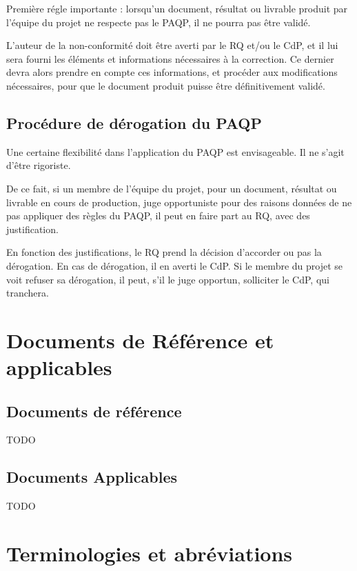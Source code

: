 Première régle importante : lorsqu'un document, résultat ou livrable produit par l'équipe du projet ne respecte pas le PAQP, il ne pourra pas être validé.

L'auteur de la non-conformité doit être averti par le RQ et/ou le CdP, et il lui sera fourni les éléments et informations nécessaires à la correction. Ce dernier devra alors prendre en compte ces informations, et procéder aux modifications nécessaires, pour que le document produit puisse être définitivement validé.

\subsection{Procédure de dérogation du PAQP}
Une certaine flexibilité dans l'application du PAQP est envisageable. Il ne s'agit d'être rigoriste.

De ce fait, si un membre de l'équipe du projet, pour un document, résultat ou livrable en cours de production, juge opportuniste pour des raisons données de ne pas appliquer des règles du PAQP, il peut en faire part au RQ, avec des justification.

En fonction des justifications, le RQ prend la décision d'accorder ou pas la dérogation. En cas de dérogation, il en averti le CdP. Si le membre du projet se voit refuser sa dérogation, il peut, s'il le juge opportun, solliciter le CdP, qui tranchera.
\section{Documents de Référence et applicables}
\subsection{Documents de référence}
\begin{center} \begin{Large}TODO\end{Large}  \end{center}
\subsection{Documents Applicables}
\begin{center} \begin{Large}TODO\end{Large}  \end{center}
\section{Terminologies et abréviations}

